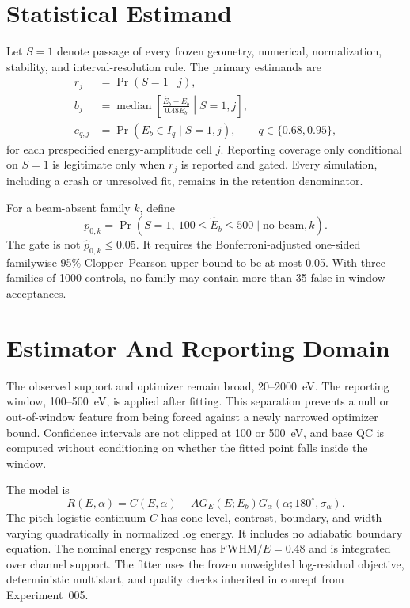 \documentclass[11pt]{article}
\begin{document}
\section{Statistical Estimand}

Let $S=1$ denote passage of every frozen geometry, numerical, normalization,
stability, and interval-resolution rule.  The primary estimands are
\begin{align}
  r_j &= \Pr(S=1\mid j),\\
  b_j &= \operatorname{median}
  \left[\frac{\widehat E_b-E_b}{0.48E_b}\middle|S=1,j\right],\\
  c_{q,j} &= \Pr(E_b\in I_q\mid S=1,j),\qquad q\in\{0.68,0.95\},
\end{align}
for each prespecified energy-amplitude cell $j$.  Reporting coverage only
conditional on $S=1$ is legitimate only when $r_j$ is reported and gated.
Every simulation, including a crash or unresolved fit, remains in the
retention denominator.

For a beam-absent family $k$, define
\begin{equation}
  p_{0,k}=\Pr\left(S=1,\ 100\leq\widehat E_b\leq500
  \mid\text{no beam},k\right).
\end{equation}
The gate is not $\widehat p_{0,k}\leq0.05$.  It requires the
Bonferroni-adjusted one-sided familywise-95\% Clopper--Pearson upper bound to be
at most 0.05.  With three families of 1000 controls, no family may contain more
than 35 false in-window acceptances.

\section{Estimator And Reporting Domain}

The observed support and optimizer remain broad, 20--2000~eV.  The reporting
window, 100--500~eV, is applied after fitting.  This separation prevents a null
or out-of-window feature from being forced against a newly narrowed optimizer
bound.  Confidence intervals are not clipped at 100 or 500~eV, and base QC is
computed without conditioning on whether the fitted point falls inside the
window.

The model is
\begin{equation}
  R(E,\alpha)=C(E,\alpha)+A
  G_E(E;E_b)G_\alpha(\alpha;180^\circ,\sigma_\alpha).
  \label{eq:model}
\end{equation}
The pitch-logistic continuum $C$ has cone level, contrast, boundary, and width
varying quadratically in normalized log energy.  It includes no adiabatic
boundary equation.  The nominal energy response has
$\mathrm{FWHM}/E=0.48$ and is integrated over channel support.  The fitter uses
the frozen unweighted log-residual objective, deterministic multistart, and
quality checks inherited in concept from Experiment~005.
\end{document}
